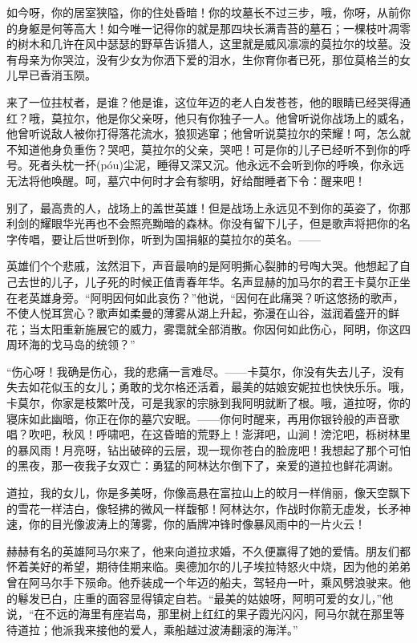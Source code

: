 \documentclass[12pt,oneside]{book}
\begin{document}
如今呀，你的居室狭隘，你的住处昏暗！你的坟墓长不过三步，哦，你呀，从前你的身躯是何等高大！如今唯一记得你的就是那四块长满青苔的墓石；一棵枝叶凋零的树木和几许在风中瑟瑟的野草告诉猎人，这里就是威风凛凛的莫拉尔的坟墓。没有母亲为你哭泣，没有少女为你洒下爱的泪水，生你育你者已死，那位莫格兰的女儿早已香消玉陨。

来了一位拄杖者，是谁？他是谁，这位年迈的老人白发苍苍，他的眼睛已经哭得通红？哦，莫拉尔，他是你父亲呀，他只有你独子一人。他曾听说你战场上的威名，他曾听说敌人被你打得落花流水，狼狈逃窜；他曾听说莫拉尔的荣耀！呵，怎么就不知道他身负重伤？哭吧，莫拉尔的父亲，哭吧！可是你的儿子已经听不到你的呼号。死者头枕一抔(póu)尘泥，睡得又深又沉。他永远不会听到你的呼唤，你永远无法将他唤醒。呵，墓穴中何时才会有黎明，好给酣睡者下令：醒来吧！

别了，最高贵的人，战场上的盖世英雄！但是战场上永远见不到你的英姿了，你那利剑的耀眼华光再也不会照亮黝暗的森林。你没有留下儿子，但是歌声将把你的名字传唱，要让后世听到你，听到为国捐躯的莫拉尔的英名。——

英雄们个个悲戚，泫然泪下，声音最响的是阿明撕心裂肺的号啕大哭。他想起了自己去世的儿子，儿子死的时候正值青春年华。名声显赫的加马尔的君王卡莫尔正坐在老英雄身旁。“阿明因何如此哀伤？”他说，“因何在此痛哭？听这悠扬的歌声，不使人悦耳赏心？歌声如柔曼的薄雾从湖上升起，弥漫在山谷，滋润着盛开的鲜花；当太阳重新施展它的威力，雾霭就全部消散。你因何如此伤心，阿明，你这四周环海的戈马岛的统领？”

“伤心呀！我确是伤心，我的悲痛一言难尽。——卡莫尔，你没有失去儿子，没有失去如花似玉的女儿；勇敢的戈尔格还活着，最美的姑娘安妮拉也快快乐乐。哦，卡莫尔，你家是枝繁叶茂，可是我家的宗脉到我阿明就断了根。哦，道拉呀，你的寝床如此幽暗，你正在你的墓穴安眠。——你何时醒来，再用你银铃般的声音歌唱？吹吧，秋风！呼啸吧，在这昏暗的荒野上！澎湃吧，山涧！滂沱吧，栎树林里的暴风雨！月亮呀，钻出破碎的云层，现一现你苍白的脸庞吧！我想起了那个可怕的黑夜，那一夜我子女双亡：勇猛的阿林达尔倒下了，亲爱的道拉也鲜花凋谢。

道拉，我的女儿，你是多美呀，你像高悬在富拉山上的皎月一样俏丽，像天空飘下的雪花一样洁白，像轻拂的微风一样馥郁！阿林达尔，作战时你箭无虚发，长矛神速，你的目光像波涛上的薄雾，你的盾牌冲锋时像暴风雨中的一片火云！

赫赫有名的英雄阿马尔来了，他来向道拉求婚，不久便赢得了她的爱情。朋友们都怀着美好的希望，期待佳期来临。奥德加尔的儿子埃拉特怒火中烧，因为他的弟弟曾在阿马尔手下殒命。他乔装成一个年迈的船夫，驾轻舟一叶，乘风劈浪驶来。他的鬈发已白，庄重的面容显得镇定自若。“最美的姑娘呀，阿明可爱的女儿，”他说，“在不远的海里有座岩岛，那里树上红红的果子霞光闪闪，阿马尔就在那里等待道拉；他派我来接他的爱人，乘船越过波涛翻滚的海洋。”
\end{document}
